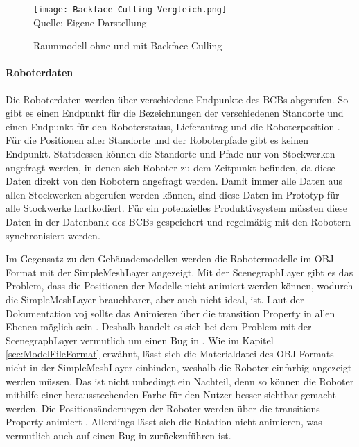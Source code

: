 \begin{figure}[H]
    \caption{Raummodell ohne und mit Backface Culling}\label{fig:BackfaceCulling}
    \texttt{[image: Backface Culling Vergleich.png]}
    \\
    Quelle: Eigene Darstellung
\end{figure}

\paragraph{Roboterdaten}\label{sec:RobotData}
Die Roboterdaten werden über verschiedene Endpunkte des \ac{BCB}s abgerufen. So gibt es einen Endpunkt für die Bezeichnungen der verschiedenen Standorte und einen Endpunkt für den Roboterstatus, Lieferautrag und die Roboterposition \cite{BCBSwagger}. Für die Positionen aller Standorte und der Roboterpfade gibt es keinen Endpunkt. Stattdessen können die Standorte und Pfade nur von Stockwerken angefragt werden, in denen sich Roboter zu dem Zeitpunkt befinden, da diese Daten direkt von den Robotern angefragt werden. Damit immer alle Daten aus allen Stockwerken abgerufen werden können, sind diese Daten im Prototyp für alle Stockwerke hartkodiert. Für ein potenzielles Produktivsystem müssten diese Daten in der Datenbank des \ac{BCB}s gespeichert und regelmäßig mit den Robotern synchronisiert werden.

Im Gegensatz zu den Gebäuademodellen werden die Robotermodelle im \ac{OBJ}-Format mit der SimpleMeshLayer \cite{DeckglSimpleMeshLayer} angezeigt. Mit der ScenegraphLayer gibt es das Problem, dass die Positionen der Modelle nicht animiert werden können, wodurch die SimpleMeshLayer brauchbarer, aber auch nicht ideal, ist. Laut der Dokumentation voj \deckgl{} sollte das Animieren über die transition Property in allen Ebenen möglich sein \cite{DeckglLayerClass}. Deshalb handelt es sich bei dem Problem mit der ScenegraphLayer vermutlich um einen Bug in \deckgl{}. Wie im Kapitel \ref{sec:ModelFileFormat} erwähnt, lässt sich die Materialdatei des \ac{OBJ} Formats nicht in der SimpleMeshLayer einbinden, weshalb die Roboter einfarbig angezeigt werden müssen. Das ist nicht unbedingt ein Nachteil, denn so können die Roboter mithilfe einer herausstechenden Farbe für den Nutzer besser sichtbar gemacht werden. Die Positionsänderungen der Roboter werden über die transitions Property animiert \cite{DeckglLayerClass}. Allerdings lässt sich die Rotation nicht animieren, was vermutlich auch auf einen Bug in \deckgl{} zurückzuführen ist.

